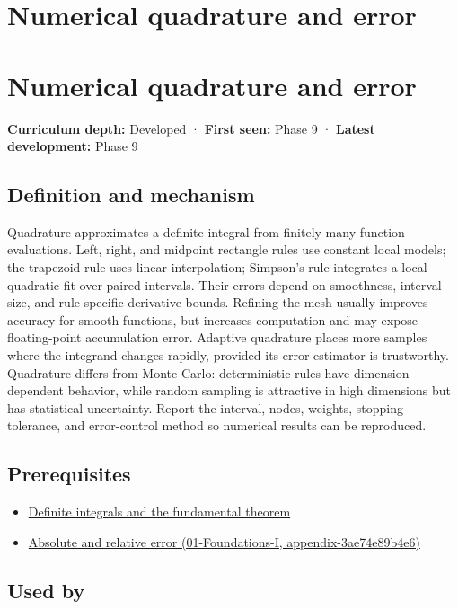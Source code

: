 \hypertarget{appendix-80521eae6b71}{}
\section*{Numerical quadrature and error}
\section{Numerical quadrature and error}\label{numerical-quadrature-and-error}

\textbf{Curriculum depth:} Developed · \textbf{First seen:} Phase 9 · \textbf{Latest development:} Phase 9

\subsection{Definition and mechanism}\label{definition-and-mechanism}

Quadrature approximates a definite integral from finitely many function evaluations. Left, right, and midpoint rectangle rules use constant local models; the trapezoid rule uses linear interpolation; Simpson's rule integrates a local quadratic fit over paired intervals. Their errors depend on smoothness, interval size, and rule-specific derivative bounds. Refining the mesh usually improves accuracy for smooth functions, but increases computation and may expose floating-point accumulation error. Adaptive quadrature places more samples where the integrand changes rapidly, provided its error estimator is trustworthy. Quadrature differs from Monte Carlo: deterministic rules have dimension-dependent behavior, while random sampling is attractive in high dimensions but has statistical uncertainty. Report the interval, nodes, weights, stopping tolerance, and error-control method so numerical results can be reproduced.

\subsection{Prerequisites}\label{prerequisites}

\begin{itemize}
\tightlist
\item
  \hyperref[appendix-1a50e72435c2]{Definite integrals and the fundamental theorem}
\item
  \href{}{Absolute and relative error (01-Foundations-I, appendix-3ae74e89b4e6)}
\end{itemize}

\subsection{Used by}\label{used-by}

